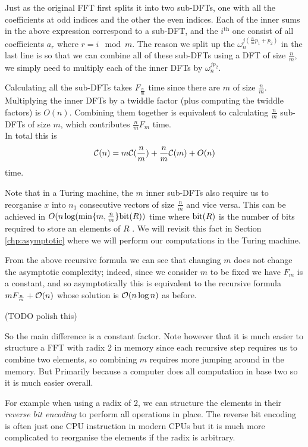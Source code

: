 
Just as the original FFT first splits it into two sub-DFTs, one with all the coefficients at odd indices and the other the even indices. Each of the inner sums in the above expression correspond to a sub-DFT, and the $i^{\text{th}}$ one consist of all coefficients $a_r$ where $r = i \mod m$. The reason we split up the $\omega_n^{j(\frac{n}{m}p_1 + p_2)}$ in the last line is so that we can combine all of these sub-DFTs using a DFT of size $\frac{n}{m}$, we simply need to multiply each of the inner DFTs by $\omega_n^{jp_2}$.

Calculating all the sub-DFTs takes $F_{\frac{n}{m}}$ time since there are $m$ of size $\frac{n}{m}$. Multiplying the inner DFTs by a twiddle factor (plus computing the twiddle factors) is $O(n)$. Combining them together is equivalent to calculating $\frac{n}{m}$ sub-DFTs of size $m$, which contributes $\frac{n}{m}F_{m}$ time.\\
In total this is
\[
    \mathcal C(n) = m\mathcal C(\frac{n}{m}) + \frac{n}{m}\mathcal C(m) + O(n)
\]
time.

Note that in a Turing machine, the $m$ inner sub-DFTs also require us to reorganise $x$ into $n_1$ consecutive vectors of size $\frac{n}{m}$ and vice versa. This can be achieved in $O(n \log( \min \{m, \frac{n}{m}\}\textrm{bit}(R))$ time where $\textrm{bit}(R)$ is the number of bits required to store an elements of $R$ \cite{ffnlogn}. We will revisit this fact in Section \ref{chp:asymptotic} where we will perform our computations in the Turing machine.

From the above recursive formula we can see that changing $m$ does not change the asymptotic complexity; indeed, since we consider $m$ to be fixed we have $F_m$ is a constant, and so asymptotically this is equivalent to the recursive formula $mF_{\frac{n}{m}} + \mathcal O(n)$ whose solution is $\mathcal O(n \log n)$ as before. 

\medskip
(TODO polish this)
\medskip

So the main difference is a constant factor. Note however that it is much easier to structure a FFT with radix $2$ in memory since each recursive step requires us to combine two elements, so combining $m$ requires more jumping around in the memory. But Primarily because a computer does all computation in base two so it is much easier overall.

For example when using a radix of 2, we can structure the elements in their \emph{reverse bit encoding} to perform all operations in place. The reverse bit encoding is often just one CPU instruction in modern CPUs but it is much more complicated to reorganise the elements if the radix is arbitrary.

